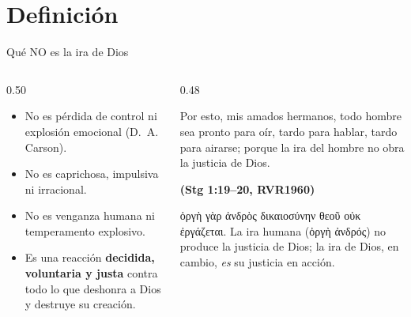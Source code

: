 \documentclass[hyperref={bookmarks=false},aspectratio=169]{beamer}
\newcommand{\grc}[1]{\foreignlanguage{ancientgreek}{#1}}
\newcommand{\fuente}[1]{\par\hfill{\upshape\bfseries\footnotesize\textcolor{azul}{#1}}}
\newcommand{\destacar}[1]{\textbf{\textcolor{azul}{#1}}}
\begin{document}
\section{Definición}

\begin{frame}{Qué NO es la ira de Dios}
\begin{columns}[t,onlytextwidth]
\begin{column}{0.50\textwidth}\small
\begin{itemize}
\item No es pérdida de control ni explosión emocional (D.~A. Carson).
\item No es caprichosa, impulsiva ni irracional.
\item No es venganza humana ni temperamento explosivo.
\item Es una reacción \destacar{decidida, voluntaria y justa} contra todo lo que deshonra a Dios y destruye su creación.
\end{itemize}
\end{column}
\begin{column}{0.48\textwidth}
\begin{cita}Por esto, mis amados hermanos, todo hombre sea pronto para oír, tardo para hablar, tardo para airarse; porque la ira del hombre no obra la justicia de Dios.\fuente{(Stg 1:19--20, RVR1960)}\end{cita}
\scriptsize\grc{ὀργὴ γὰρ ἀνδρὸς δικαιοσύνην θεοῦ οὐκ ἐργάζεται}. La ira humana (\grc{ὀργὴ ἀνδρός}) no produce la justicia de Dios; la ira de Dios, en cambio, \emph{es} su justicia en acción.
\end{column}
\end{columns}
\end{frame}
\end{document}
